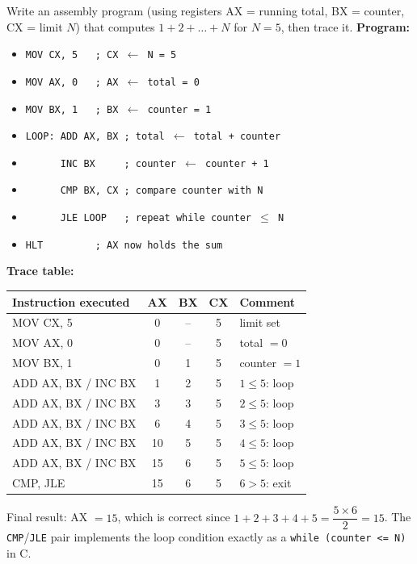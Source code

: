 \documentclass[11pt]{article}
\begin{document}
\begin{exoresolu}
Write an assembly program (using registers AX = running total, BX = counter, CX = limit $N$) that computes $1 + 2 + \dots + N$ for $N = 5$, then trace it.
\tcblower
\textbf{Program:}
\begin{itemize}
\item[] \texttt{MOV CX, 5\ \ \ ; CX $\leftarrow$ N = 5}
\item[] \texttt{MOV AX, 0\ \ \ ; AX $\leftarrow$ total = 0}
\item[] \texttt{MOV BX, 1\ \ \ ; BX $\leftarrow$ counter = 1}
\item[] \texttt{LOOP: ADD AX, BX\ ; total $\leftarrow$ total + counter}
\item[] \texttt{\ \ \ \ \ \ INC BX\ \ \ \ \ ; counter $\leftarrow$ counter + 1}
\item[] \texttt{\ \ \ \ \ \ CMP BX, CX\ ; compare counter with N}
\item[] \texttt{\ \ \ \ \ \ JLE LOOP\ \ \ ; repeat while counter $\leq$ N}
\item[] \texttt{HLT\ \ \ \ \ \ \ \ \ ; AX now holds the sum}
\end{itemize}
\textbf{Trace table:}
\begin{center}
\begin{tabular}{|l|c|c|c|l|}
\hline
\rowcolor{popblueL} Instruction executed & AX & BX & CX & Comment \\ \hline
MOV CX, 5 & 0 & -- & 5 & limit set \\ \hline
MOV AX, 0 & 0 & -- & 5 & total $=0$ \\ \hline
MOV BX, 1 & 0 & 1 & 5 & counter $=1$ \\ \hline
ADD AX, BX / INC BX & 1 & 2 & 5 & $1 \leq 5$: loop \\ \hline
ADD AX, BX / INC BX & 3 & 3 & 5 & $2 \leq 5$: loop \\ \hline
ADD AX, BX / INC BX & 6 & 4 & 5 & $3 \leq 5$: loop \\ \hline
ADD AX, BX / INC BX & 10 & 5 & 5 & $4 \leq 5$: loop \\ \hline
ADD AX, BX / INC BX & 15 & 6 & 5 & $5 \leq 5$: loop \\ \hline
CMP, JLE & 15 & 6 & 5 & $6 > 5$: exit \\ \hline
\end{tabular}
\end{center}
Final result: AX $= 15$, which is correct since $1+2+3+4+5 = \dfrac{5 \times 6}{2} = 15$. The \texttt{CMP}/\texttt{JLE} pair implements the loop condition exactly as a \texttt{while (counter <= N)} in C.
\end{exoresolu}
\end{document}
